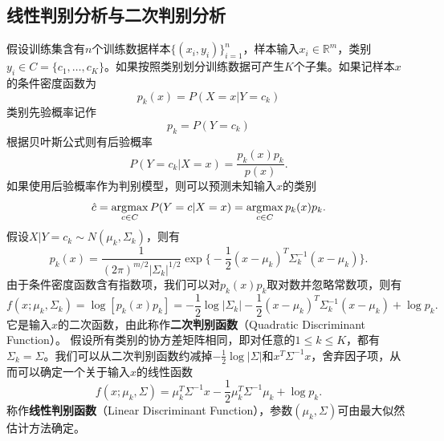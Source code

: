 \subsection{线性判别分析与二次判别分析}
假设训练集含有$n$个训练数据样本$\{(x_i,y_i)\}_{i=1}^n$，样本输入$x_i\in \mathbb R^m$，类别$y_i\in C=\{c_1,\ldots, c_K\}$。如果按照类别划分训练数据可产生$K$个子集。如果记样本$x$的条件密度函数为
\[
    p_k(x)=P(X=x|Y=c_k)
\]
类别先验概率记作
\[
    p_k=P(Y=c_k)
\]
根据贝叶斯公式则有后验概率
\[
    P(Y=c_k|X=x) = \frac{p_k(x) p_k}{p(x)}.
\]
如果使用后验概率作为判别模型，则可以预测未知输入$x$的类别
\[
    \hat c = \operatorname*{\mathrm{\arg\!\max}}\limits_{c\in C} P(Y=c|X=x) = \operatorname*{\mathrm{\arg\!\max}}\limits_{c\in C} p_k(x) p_k.
\]
假设$X|Y=c_k\sim N(\mu_k,\Sigma_k)$，则有
\[
    p_k(x) = \frac{1}{(2\pi)^{m/2} |\Sigma_k|^{1/2}} \exp\big\{-\frac{1}{2} (x-\mu_k)^T\Sigma_k^{-1}(x-\mu_k)\big\}.
\]
由于条件密度函数含有指数项，我们可以对$p_k(x) p_k$取对数并忽略常数项，则有
\begin{equation}\label{eq:qda}
    f(x;\mu_k,\Sigma_k) = \log [p_k(x) p_k]= -\frac{1}{2} \log |\Sigma_k| - \frac{1}{2} (x-\mu_k)^T\Sigma_k^{-1}(x-\mu_k) +\log p_k.
\end{equation}
它是输入$x$的二次函数，由此称作\textbf{二次判别函数}（Quadratic Discriminant Function）。
假设所有类别的协方差矩阵相同，即对任意的$1\le k\le K$，都有$\Sigma_k=\Sigma$。我们可以从二次判别函数约减掉$-\frac{1}{2} \log |\Sigma|$和$x^T\Sigma^{-1}x$，舍弃因子项，从而可以确定一个关于输入$x$的线性函数
\[
    f(x;\mu_k,\Sigma) = \mu_k^T \Sigma^{-1} x - \frac{1}{2} \mu_k^T \Sigma^{-1} \mu_k +\log p_k.
\]
称作\textbf{线性判别函数}（Linear Discriminant Function），参数$(\mu_k,\Sigma)$可由最大似然估计方法确定。

